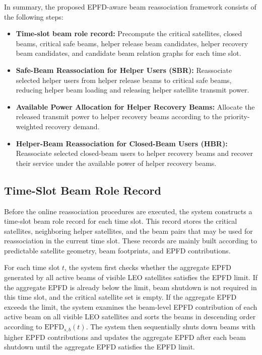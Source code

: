 In summary, the proposed EPFD-aware beam reassociation framework consists of the following steps:
\begin{itemize}[leftmargin=*,nosep]
  \item \textbf{Time-slot beam role record:} Precompute the critical satellites, closed beams, critical safe beams, helper release beam candidates, helper recovery beam candidates, and candidate beam relation graphs for each time slot.
  \item \textbf{Safe-Beam Reassociation for Helper Users (SBR):} Reassociate selected helper users from helper release beams to critical safe beams, reducing helper beam loading and releasing helper satellite transmit power.
  \item \textbf{Available Power Allocation for Helper Recovery Beams:} Allocate the released transmit power to helper recovery beams according to the priority-weighted recovery demand.
  \item \textbf{Helper-Beam Reassociation for Closed-Beam Users (HBR):} Reassociate selected closed-beam users to helper recovery beams and recover their service under the available power of helper recovery beams.
\end{itemize}

\subsection{Time-Slot Beam Role Record}

Before the online reassociation procedures are executed, the system constructs a time-slot beam role record for each time slot. This record stores the critical satellites, neighboring helper satellites, and the beam pairs that may be used for reassociation in the current time slot. These records are mainly built according to predictable satellite geometry, beam footprints, and EPFD contributions.

For each time slot $t$, the system first checks whether the aggregate EPFD generated by all active beams of visible LEO satellites satisfies the EPFD limit. If the aggregate EPFD is already below the limit, beam shutdown is not required in this time slot, and the critical satellite set is empty. If the aggregate EPFD exceeds the limit, the system examines the beam-level EPFD contribution of each active beam on all visible LEO satellites and sorts the beams in descending order according to $\mathrm{EPFD}_{s,b}(t)$. The system then sequentially shuts down beams with higher EPFD contributions and updates the aggregate EPFD after each beam shutdown until the aggregate EPFD satisfies the EPFD limit.

